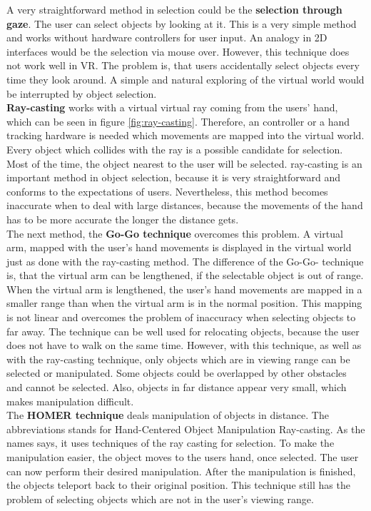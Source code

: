A very straightforward method in selection could be the \textbf{selection through gaze}. The user can select objects by looking at it. This is a very simple method and works without hardware controllers for user input. An analogy in 2D interfaces would be the selection via mouse over. However, this technique does not work well in VR. The problem is, that users accidentally select objects every time they look around. A simple and natural exploring of the virtual world would be interrupted by object selection.\\
\textbf{Ray-casting} works with a virtual virtual ray coming from the users' hand, which can be seen in figure \ref{fig:ray-casting}. Therefore, an controller or a hand tracking hardware is needed which movements are mapped into the virtual world. Every object which collides with the ray is a possible candidate for selection. Most of the time, the object nearest to the user will be selected. ray-casting is an important method in object selection, because it is very straightforward and conforms to the expectations of users. Nevertheless, this method becomes inaccurate when to deal with large distances, because the movements of the hand has to be more accurate the longer the distance gets. \\
The next method, the \textbf{Go-Go technique} overcomes this problem. A virtual arm, mapped with the user's hand movements is displayed in the virtual world just as done with the ray-casting method. The difference of the Go-Go- technique is, that the virtual arm can be lengthened, if the selectable object is out of range. When the virtual arm is lengthened, the user's hand movements are mapped in a smaller range than when the virtual arm is in the normal position. This mapping is not linear and overcomes the problem of inaccuracy when selecting objects to far away. The technique can be well used for relocating objects, because the user does not have to walk on the same time. However, with this technique, as well as with the ray-casting technique, only objects which are in viewing range can be selected or manipulated. Some objects could be overlapped by other obstacles and cannot be selected. Also, objects in far distance appear very small, which makes manipulation difficult.\\
The \textbf{HOMER technique} deals manipulation of objects in distance. The abbreviations stands for Hand-Centered Object Manipulation Ray-casting. As the names says, it uses techniques of the ray casting for selection. To make the manipulation easier, the object moves to the users hand, once selected. The user can now perform their desired manipulation. After the manipulation is finished, the objects teleport back to their original position. This technique still has the problem of selecting objects which are not in the user's viewing range.\\
